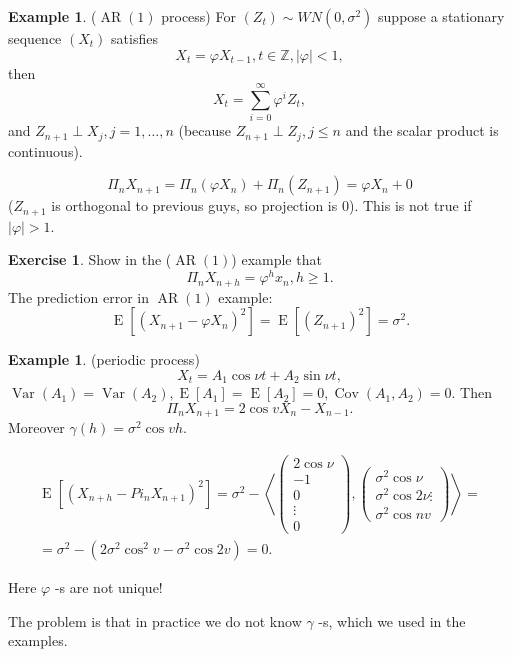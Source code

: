 \documentclass[12pt,a4paper, notitlepage]{book}
\theoremstyle{definition} %
\newtheorem{example}[definition]{Example}
\newtheorem{exercise}[definition]{Exercise}
\theoremstyle{plain} %
\newcommand{\Z}{\mathbb Z}
\DeclareMathOperator{\Var}{Var}
\DeclareMathOperator{\Cov}{Cov}
\DeclareMathOperator{\E}{E}
\DeclareMathOperator{\Ar}{AR}
\begin{document}
\begin{example} ($\Ar(1)$ process)
For $(Z_t) \sim WN(0, \sigma^2)$ suppose a stationary sequence $(X_t)$ satisfies
\[ X_t = \varphi X_{t-1}, t\in \Z, |\varphi| < 1, \]  then
\[ X_t = \sum_{i = 0}^\infty \varphi^i Z_t , \]  and
$Z_{n+1} \perp X_j, j=1,\dots,n$ (because $Z_{n+1} \perp Z_j, j\leq n$ and the scalar product is continuous).

\[ \Pi_n X_{n+1} = \Pi_n(\varphi X_n) + \Pi_n(Z_{n+1}) = \varphi X_n + 0 \]
 ($Z_{n+1}$ is orthogonal to previous guys, so projection is $0$). This is not true if $|\varphi| > 1$.

\end{example}

\begin{exercise}
Show in the ($\Ar(1)$) example that 
\[ \Pi_n X_{n+h} = \varphi^h x_n, h \geq 1. \]
 The prediction error in $\Ar(1)$ example:
\[ \E \left[ (X_{n+1} - \varphi X_n)^2 \right] = \E \left[ (Z_{n+1})^2 \right] = \sigma ^2 . \]
\end{exercise}

\begin{example} (periodic process)
\[ X_t = A_1 \cos{\nu t} + A_2 \sin{\nu t}, \] 
 $  \Var( A_1) = \Var (A_2) , \E[A_1] =  \E[A_2] = 0, \Cov(A_1, A_2) = 0$.
Then 
\[ \Pi_n X_{n+1} = 2 \cos{v} X_n - X_{n-1} . \]
 Moreover 
$ \gamma(h)  = \sigma^2 \cos{vh}$.  

\begin{align*}
 \E\left[(X_{n+h} - Pi_nX_{n+1})^2\right] = \sigma^2 - \left<\left( \begin{array}{c} 2 \cos{\nu} \\ -1 \\ 0 \\ \vdots \\ 0 \end{array} \right), \left( \begin{array} {c} \sigma^2\cos{\nu} \\ \sigma^2 \cos{2\nu} \vdots \\ \sigma^2 \cos{n v} \end{array} \right) \right> = \\
= \sigma^2 - (2 \sigma^2 \cos^2{v} - \sigma^2 \cos{2v}) = 0 . \end{align*}

Here $\varphi$ -s are not unique! 
\end{example}

The problem is that in practice we do not know $\gamma$ -s, which we used in the examples.
\end{document}
